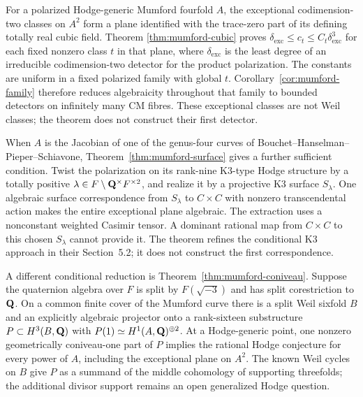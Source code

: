 For a polarized Hodge-generic Mumford fourfold $A$, the exceptional
codimension-two classes on $A^2$ form a plane identified with the
trace-zero part of its defining totally real cubic field. Theorem
\ref{thm:mumford-cubic} proves
$\delta_{\mathrm{exc}}\leq c_t\leq C_t\delta_{\mathrm{exc}}^3$
for each fixed nonzero class $t$ in that plane, where
$\delta_{\mathrm{exc}}$ is the least degree of an irreducible
codimension-two detector for the product polarization. The constants
are uniform in a fixed polarized family with global $t$.
Corollary~\ref{cor:mumford-family} therefore reduces algebraicity
throughout that family to bounded detectors on infinitely many CM
fibres. These exceptional classes are not Weil classes; the theorem
does not construct their first detector.

When $A$ is the Jacobian of one of the genus-four curves of Bouchet--Hanselman--Pieper--Schiavone, Theorem~\ref{thm:mumford-surface} gives a further sufficient condition. Twist the polarization on its rank-nine K3-type Hodge structure by a totally positive $\lambda\in F\setminus\mathbf Q^\times F^{\times2}$, and realize it by a projective K3 surface $S_\lambda$. One algebraic surface correspondence from $S_\lambda$ to $C\times C$ with nonzero transcendental action makes the entire exceptional plane algebraic. The extraction uses a nonconstant weighted Casimir tensor. A dominant rational map from $C\times C$ to this chosen $S_\lambda$ cannot provide it. The theorem refines the conditional K3 approach in their Section~5.2; it does not construct the first correspondence.

A different conditional reduction is Theorem~\ref{thm:mumford-coniveau}. Suppose the quaternion algebra over $F$ is split by $F(\sqrt{-3})$ and has split corestriction to $\mathbf Q$. On a common finite cover of the Mumford curve there is a split Weil sixfold $B$ and an explicitly algebraic projector onto a rank-sixteen substructure $P\subset H^3(B,\mathbf Q)$ with $P(1)\simeq H^1(A,\mathbf Q)^{\oplus2}$. At a Hodge-generic point, one nonzero geometrically coniveau-one part of $P$ implies the rational Hodge conjecture for every power of $A$, including the exceptional plane on $A^2$. The known Weil cycles on $B$ give $P$ as a summand of the middle cohomology of supporting threefolds; the additional divisor support remains an open generalized Hodge question.
